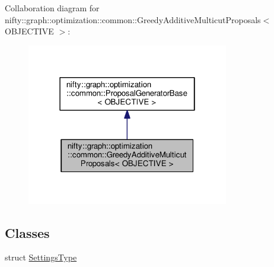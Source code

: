 Collaboration diagram for nifty\+:\+:graph\+:\+:optimization\+:\+:common\+:\+:Greedy\+Additive\+Multicut\+Proposals$<$ O\+B\+J\+E\+C\+T\+I\+V\+E $>$\+:\nopagebreak
\begin{figure}[H]
\begin{center}
\leavevmode
\includegraphics[width=250pt]{classnifty_1_1graph_1_1optimization_1_1common_1_1GreedyAdditiveMulticutProposals__coll__graph}
\end{center}
\end{figure}
\subsection*{Classes}
\begin{DoxyCompactItemize}
\item 
struct \hyperlink{structnifty_1_1graph_1_1optimization_1_1common_1_1GreedyAdditiveMulticutProposals_1_1SettingsType}{Settings\+Type}
\end{DoxyCompactItemize}
